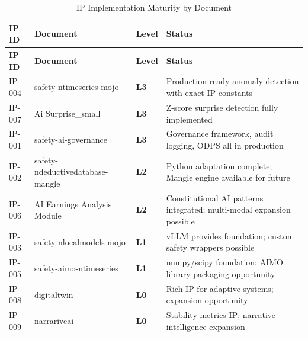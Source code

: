 \begin{longtable}{@{}p{1.2cm}p{4cm}p{1.5cm}p{5.5cm}@{}}
\toprule
\textbf{IP ID} & \textbf{Document} & \textbf{Level} & \textbf{Status} \\
\midrule
\endfirsthead
\toprule
\textbf{IP ID} & \textbf{Document} & \textbf{Level} & \textbf{Status} \\
\midrule
\endhead
\bottomrule
\caption{IP Implementation Maturity by Document}
\label{tab:maturity-assessment}
\endlastfoot

IP-004 & safety-ntimeseries-mojo & \textcolor{green!60!black}{\textbf{L3}} & Production-ready anomaly detection with exact IP constants \\
\addlinespace

IP-007 & Ai Surprise\_small & \textcolor{green!60!black}{\textbf{L3}} & Z-score surprise detection fully implemented \\
\addlinespace

IP-001 & safety-ai-governance & \textcolor{green!60!black}{\textbf{L3}} & Governance framework, audit logging, ODPS all in production \\
\addlinespace

IP-002 & safety-ndeductivedatabase-mangle & \textcolor{blue!60!black}{\textbf{L2}} & Python adaptation complete; Mangle engine available for future \\
\addlinespace

IP-006 & AI Earnings Analysis Module & \textcolor{blue!60!black}{\textbf{L2}} & Constitutional AI patterns integrated; multi-modal expansion possible \\
\addlinespace

IP-003 & safety-nlocalmodels-mojo & \textcolor{orange!70!black}{\textbf{L1}} & vLLM provides foundation; custom safety wrappers possible \\
\addlinespace

IP-005 & safety-aimo-ntimeseries & \textcolor{orange!70!black}{\textbf{L1}} & numpy/scipy foundation; AIMO library packaging opportunity \\
\addlinespace

IP-008 & digitaltwin & \textcolor{purple!60!black}{\textbf{L0}} & Rich IP for adaptive systems; expansion opportunity \\
\addlinespace

IP-009 & narrariveai & \textcolor{purple!60!black}{\textbf{L0}} & Stability metrics IP; narrative intelligence expansion \\

\end{longtable}

